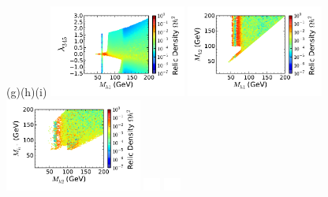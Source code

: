 \begin{figure}[htb]
\vskip 0.2cm
\hspace*{1.4cm}(g)\hspace*{0.35\textwidth}\hspace*{-1.5cm}(h)\hspace*{0.35\textwidth}\hspace*{-1.6cm}(i)
\vskip 0.0cm
{\hspace*{-0.3cm}\includegraphics[width=0.4\textwidth]{Figures/Mh1_ld345_Omega_small-cut12345678_z.pdf}}%
{\hspace*{-1.55cm}\includegraphics[width=0.4\textwidth]{Figures/Mh1_Mh2_Omega_small-cut12345678_z.pdf}}%
{\hspace*{-1.55cm}\includegraphics[width=0.4\textwidth]{Figures/Mhc_Mh2_Omega_small-cut12345678_z.pdf}}%
\vskip -5.2cm
\hspace*{4.9cm}\includegraphics[width=0.55cm,height=4.cm]{Figures/blank.pdf}%
\hspace*{4.9cm}\includegraphics[width=0.55cm,height=4.cm]{Figures/blank.pdf}%

\end{figure}
